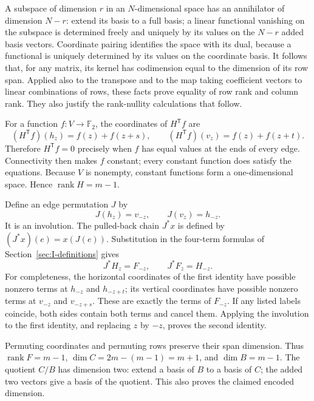 \documentclass{article}
\numberwithin{equation}{section}
\begin{document}
A subspace of dimension \(r\) in an \(N\)-dimensional space has an
annihilator of dimension \(N-r\): extend its basis to a full basis; a linear
functional vanishing on the subspace is determined freely and uniquely by its
values on the \(N-r\) added basis vectors. Coordinate pairing identifies the
space with its dual, because a functional is uniquely determined by its
values on the coordinate basis. It follows that, for any matrix, its kernel
has codimension equal to the dimension of its row span. Applied also to the
transpose and to the map taking coefficient vectors to linear combinations
of rows, these facts prove equality of row rank and column rank. They also
justify the rank-nullity calculations that follow.

For a function \(f:V\to\mathbb F_2\), the coordinates of \(H^{\mathsf T}f\)
are
\begin{equation}\label{eq:coboundary}
  (H^{\mathsf T}f)(h_z)=f(z)+f(z+s),\qquad
  (H^{\mathsf T}f)(v_z)=f(z)+f(z+t).
\end{equation}
Therefore \(H^{\mathsf T}f=0\) precisely when \(f\) has equal values at the
ends of every edge. Connectivity then makes \(f\) constant; every constant
function does satisfy the equations. Because \(V\) is nonempty, constant
functions form a one-dimensional space. Hence
\(\operatorname{rank}H=m-1\).

Define an edge permutation \(J\) by
\begin{equation}\label{eq:J-def}
  J(h_z)=v_{-z},\qquad J(v_z)=h_{-z}.
\end{equation}
It is an involution. The pulled-back chain \(J^*x\) is defined by
\((J^*x)(e)=x(J(e))\). Substitution in the four-term formulas of
Section~\ref{sec:I-definitions} gives
\begin{equation}\label{eq:J}
  J^*H_z=F_{-z},\qquad J^*F_z=H_{-z}.
\end{equation}
For completeness, the horizontal coordinates of the first identity have
possible nonzero terms at \(h_{-z}\) and \(h_{-z+t}\); its vertical coordinates
have possible nonzero terms at \(v_{-z}\) and \(v_{-z+s}\). These are exactly
the terms of \(F_{-z}\). If any listed labels coincide, both sides contain
both terms and cancel them. Applying the involution to the first identity,
and replacing \(z\) by \(-z\), proves the second identity.

Permuting coordinates and permuting rows preserve their span dimension.
Thus \(\operatorname{rank}F=m-1\),
\(\dim C=2m-(m-1)=m+1\), and \(\dim B=m-1\). The quotient \(C/B\) has
dimension two: extend a basis of \(B\) to a basis of \(C\); the added two
vectors give a basis of the quotient. This also proves the claimed encoded
dimension.
\end{document}
